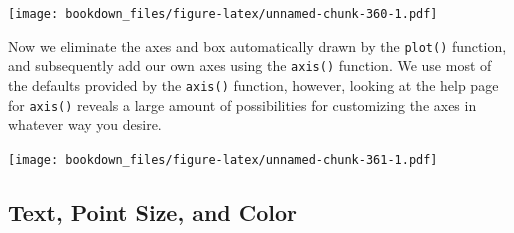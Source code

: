 \documentclass[
]{krantz}
\makeatletter
\newenvironment{Shaded}{\begin{snugshade}}{\end{snugshade}}
\newcommand{\DataTypeTok}[1]{\textcolor[rgb]{0.27,0.27,0.27}{#1}}
\newcommand{\DecValTok}[1]{\textcolor[rgb]{0.06,0.06,0.06}{#1}}
\newcommand{\KeywordTok}[1]{\textcolor[rgb]{0.27,0.27,0.27}{\textbf{#1}}}
\newcommand{\NormalTok}[1]{#1}
\newcommand{\OperatorTok}[1]{\textcolor[rgb]{0.43,0.43,0.43}{\textbf{#1}}}
\newcommand{\OtherTok}[1]{\textcolor[rgb]{0.37,0.37,0.37}{#1}}
\newcommand{\StringTok}[1]{\textcolor[rgb]{0.5,0.5,0.5}{#1}}
\newenvironment{kframe}{%
\medskip{}
\setlength{\fboxsep}{.8em}
 \def\at@end@of@kframe{}%
 \ifinner\ifhmode%
  \def\at@end@of@kframe{\end{minipage}}%
  \begin{minipage}{\columnwidth}%
 \fi\fi%
 \def\FrameCommand##1{\hskip\@totalleftmargin \hskip-\fboxsep
 \colorbox{shadecolor}{##1}\hskip-\fboxsep
     \hskip-\linewidth \hskip-\@totalleftmargin \hskip\columnwidth}%
 \MakeFramed {\advance\hsize-\width
   \@totalleftmargin\z@ \linewidth\hsize
   \@setminipage}}%
 {\par\unskip\endMakeFramed%
 \at@end@of@kframe}
\renewenvironment{Shaded}{\begin{kframe}}{\end{kframe}}
\makeatother
\begin{document}
\texttt{[image: bookdown\_files/figure-latex/unnamed-chunk-360-1.pdf]}

Now we eliminate the axes and box automatically drawn by the \texttt{plot()} function, and subsequently add our own axes using the \texttt{axis()} function. We use most of the defaults provided by the \texttt{axis()} function, however, looking at the help page for \texttt{axis()} reveals a large amount of possibilities for customizing the axes in whatever way you desire.

\begin{Shaded}
\end{Shaded}

\texttt{[image: bookdown\_files/figure-latex/unnamed-chunk-361-1.pdf]}

\hypertarget{text-point-size-and-color-1}{%
\subsection{Text, Point Size, and Color}\label{text-point-size-and-color-1}}
\end{document}
